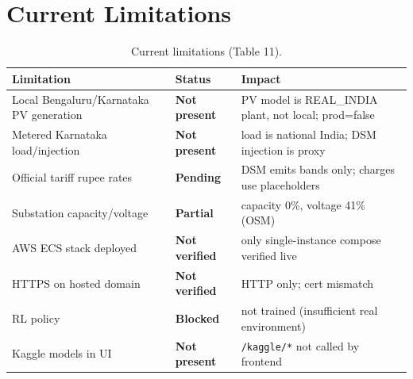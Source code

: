 \documentclass[11pt,a4paper]{article}
\newcommand{\stP}{\textcolor{cpart}{\textbf{Partial}}}
\newcommand{\stPend}{\textcolor{cpart}{\textbf{Pending}}}
\newcommand{\stB}{\textcolor{cmiss}{\textbf{Blocked}}}
\newcommand{\stNP}{\textcolor{cmiss}{\textbf{Not present}}}
\newcommand{\stNV}{\textcolor{cnv}{\textbf{Not verified}}}
\newcommand{\code}[1]{\texttt{\small #1}}
\begin{document}
\section{Current Limitations}
\begin{table}[H]\centering\footnotesize
\caption{Current limitations (Table 11).}\label{tab:limits}
\begin{tabular}{@{}p{5.2cm}l p{6.0cm}@{}}
\toprule
\textbf{Limitation} & \textbf{Status} & \textbf{Impact}\\
\midrule
Local Bengaluru/Karnataka PV generation & \stNP & PV model is REAL\_INDIA plant, not local; prod=false\\
Metered Karnataka load/injection & \stNP & load is national India; DSM injection is proxy\\
Official tariff rupee rates & \stPend & DSM emits bands only; charges use placeholders\\
Substation capacity/voltage & \stP & capacity 0\%, voltage 41\% (OSM)\\
AWS ECS stack deployed & \stNV & only single-instance compose verified live\\
HTTPS on hosted domain & \stNV & HTTP only; cert mismatch\\
RL policy & \stB & not trained (insufficient real environment)\\
Kaggle models in UI & \stNP & \code{/kaggle/*} not called by frontend\\
\bottomrule
\end{tabular}
\end{table}

\end{document}
